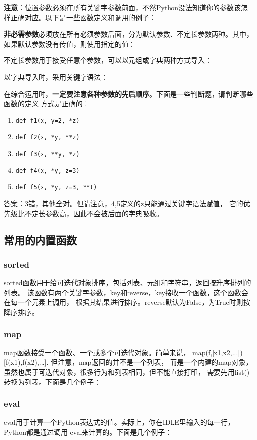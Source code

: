 \documentclass{style/ucasproposal}
\newcommand{\inlinepython}[1]{\texttt{#1}}
\begin{document}
\textbf{注意}：位置参数必须在所有关键字参数前面，不然Python没法知道你的参数该怎样正确对应。以下是一些函数定义和调用的例子：

\textbf{非必需参数}必须放在所有必须参数后面，分为默认参数、不定长参数两种。其中，如果默认参数没有传值，则使用指定的值：

不定长参数用于接受任意个参数，可以以元组或字典两种方式导入：

以字典导入时，采用关键字语法：

在综合运用时，\textbf{一定要注意各种参数的先后顺序}。下面是一些判断题，请判断哪些函数的定义
方式是正确的：
\begin{enumerate}
	\item \inlinepython{def f1(x, y=2, *z)}
	\item \inlinepython{def f2(x, *y, **z)}
	\item \inlinepython{def f3(x, **y, *z)}
	\item \inlinepython{def f4(x, *y, z=3)}
	\item \inlinepython{def f5(x, *y, z=3, **t)}
\end{enumerate}

答案：3错，其他全对。但请注意，4,5定义的z只能通过关键字语法赋值，
它的优先级比不定长参数高，因此不会被后面的字典吸收。

\subsection{常用的内置函数}
\subsubsection{sorted}
sorted函数用于给可迭代对象排序，包括列表、元组和字符串，返回按升序排列的列表。
该函数有两个关键字参数，key和reverse，key接收一个函数，这个函数会在每一个元素上调用，
根据其结果进行排序。reverse默认为False，为True时则按降序排序。

\subsubsection{map}
map函数接受一个函数、一个或多个可迭代对象。简单来说，
map(f,[x1,x2,...]) = [f(x1),f(x2),...]. 但注意，map返回的并不是一个列表，
而是一个内建的map对象，虽然也属于可迭代对象，很多行为和列表相同，但不能直接打印，
需要先用list()转换为列表。下面是几个例子：

\subsubsection{eval}
eval用于计算一个Python表达式的值。实际上，你在IDLE里输入的每一行，Python都是通过调用
eval来计算的。下面是几个例子：
\end{document}
